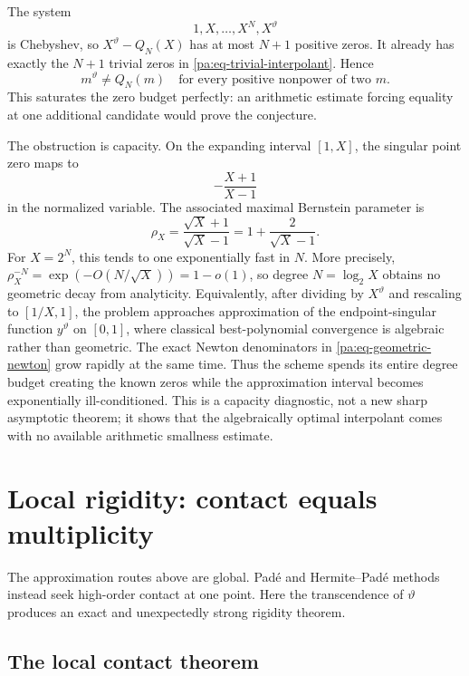 \documentclass[11pt,oneside]{article}
\theoremstyle{definition}
\theoremstyle{remark}
\newcommand{\thetaq}{\vartheta}
\begin{document}
The system
\[
 1,X,\ldots,X^N,X^{\thetaq}
\]
is Chebyshev, so \(X^{\thetaq}-Q_N(X)\) has at most \(N+1\) positive zeros.  It already has
exactly the \(N+1\) trivial zeros in \eqref{pa:eq-trivial-interpolant}.  Hence
\begin{equation}
 m^{\thetaq}\ne Q_N(m)
 \quad\text{for every positive nonpower of two }m.
 \label{pa:eq-no-extra-intersection}
\end{equation}
This saturates the zero budget perfectly: an arithmetic estimate forcing equality at one
additional candidate would prove the conjecture.

The obstruction is capacity.  On the expanding interval \([1,X]\), the singular point zero
maps to
\[
 -\frac{X+1}{X-1}
\]
in the normalized variable.  The associated maximal Bernstein parameter is
\begin{equation}
 \rho_X=\frac{\sqrt X+1}{\sqrt X-1}
 =1+\frac{2}{\sqrt X-1}.
 \label{pa:eq-expanding-rho}
\end{equation}
For \(X=2^N\), this tends to one exponentially fast in \(N\).  More precisely,
\(\rho_X^{-N}=\exp(-O(N/\sqrt X))=1-o(1)\), so degree \(N=\log_2X\) obtains no geometric
decay from analyticity.  Equivalently, after dividing by \(X^{\thetaq}\) and rescaling to
\([1/X,1]\), the problem approaches approximation of the endpoint-singular function
\(y^{\thetaq}\) on \([0,1]\), where classical best-polynomial convergence is algebraic rather
than geometric.  The exact Newton denominators in \eqref{pa:eq-geometric-newton} grow rapidly
at the same time.  Thus the scheme spends its entire degree budget creating the known zeros
while the approximation interval becomes exponentially ill-conditioned.  This is a capacity
diagnostic, not a new sharp asymptotic theorem; it shows that the algebraically optimal
interpolant comes with no available arithmetic smallness estimate.

\section{Local rigidity: contact equals multiplicity}
\label{pa:sec-contact}

The approximation routes above are global.  Pad\'e and Hermite--Pad\'e methods instead seek
high-order contact at one point.  Here the transcendence of \(\thetaq\) produces an exact and
unexpectedly strong rigidity theorem.

\subsection{The local contact theorem}
\end{document}
